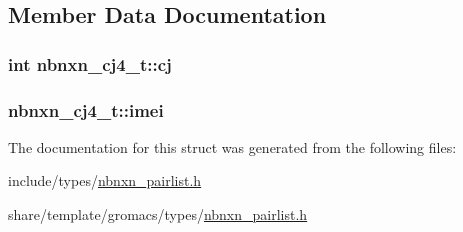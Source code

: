 \subsection{\-Member \-Data \-Documentation}
\hypertarget{structnbnxn__cj4__t_ad803e9faab3796ca7b432810e2906bf1}{
\subsubsection[{cj}]{\setlength{\rightskip}{0pt plus 5cm}int {\bf nbnxn\-\_\-cj4\-\_\-t\-::cj}}}\label{structnbnxn__cj4__t_ad803e9faab3796ca7b432810e2906bf1}
\hypertarget{structnbnxn__cj4__t_a28a64580ba8d660356993f01063563c3}{
\subsubsection[{imei}]{ {\bf nbnxn\-\_\-cj4\-\_\-t\-::imei}}}\label{structnbnxn__cj4__t_a28a64580ba8d660356993f01063563c3}


\-The documentation for this struct was generated from the following files\-:\begin{DoxyCompactItemize}
\item 
include/types/\hyperlink{include_2types_2nbnxn__pairlist_8h}{nbnxn\-\_\-pairlist.\-h}\item 
share/template/gromacs/types/\hyperlink{share_2template_2gromacs_2types_2nbnxn__pairlist_8h}{nbnxn\-\_\-pairlist.\-h}\end{DoxyCompactItemize}

